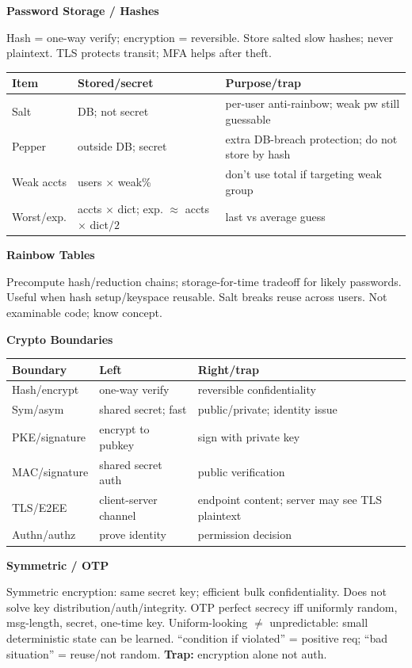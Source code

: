 \documentclass[8pt]{extarticle}
\newcommand{\h}[1]{\vspace{1pt}\textbf{#1}\par}
\newcommand{\trap}{\textbf{Trap:} }
\begin{document}
\begin{multicols*}{5}
\h{Password Storage / Hashes}
Hash = one-way verify; encryption = reversible. Store salted slow hashes; never plaintext. TLS protects transit; MFA helps after theft.
\begin{tabularx}{\linewidth}{@{}lYY@{}}
\toprule
Item & Stored/secret & Purpose/trap\\ \midrule
Salt & DB; not secret & per-user anti-rainbow; weak pw still guessable\\
Pepper & outside DB; secret & extra DB-breach protection; do not store by hash\\
Weak accts & users $\times$ weak\% & don't use total if targeting weak group\\
Worst/exp. & accts $\times$ dict; exp. $\approx$ accts $\times$ dict$/2$ & last vs average guess\\
\bottomrule
\end{tabularx}

\h{Rainbow Tables}
Precompute hash/reduction chains; storage-for-time tradeoff for likely passwords. Useful when hash setup/keyspace reusable. Salt breaks reuse across users. Not examinable code; know concept.

\h{Crypto Boundaries}
\begin{tabularx}{\linewidth}{@{}lYY@{}}
\toprule
Boundary & Left & Right/trap\\ \midrule
Hash/encrypt & one-way verify & reversible confidentiality\\
Sym/asym & shared secret; fast & public/private; identity issue\\
PKE/signature & encrypt to pubkey & sign with private key\\
MAC/signature & shared secret auth & public verification\\
TLS/E2EE & client-server channel & endpoint content; server may see TLS plaintext\\
Authn/authz & prove identity & permission decision\\
\bottomrule
\end{tabularx}

\h{Symmetric / OTP}
Symmetric encryption: same secret key; efficient bulk confidentiality. Does not solve key distribution/auth/integrity. OTP perfect secrecy iff uniformly random, msg-length, secret, one-time key. Uniform-looking $\ne$ unpredictable: small deterministic state can be learned. ``condition if violated'' = positive req; ``bad situation'' = reuse/not random. \trap encryption alone not auth.


\end{multicols*}
\end{document}
